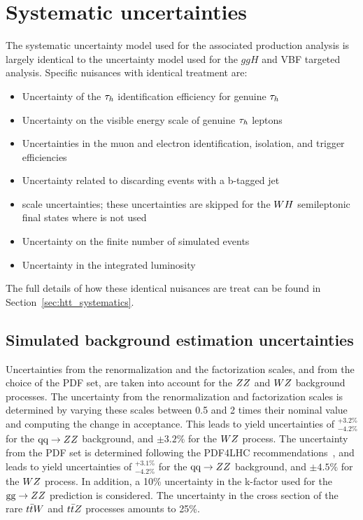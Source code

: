 \section{Systematic uncertainties}
\label{sec:vh_systematics}
The systematic uncertainty model used for the associated production analysis is largely
identical to the uncertainty model used for the $ggH$ and VBF targeted analysis.
Specific nuisances with identical treatment are:
\begin{itemize}
\item Uncertainty of the $\tau_{h}$ identification efficiency for genuine $\tau_{h}$
\item Uncertainty on the visible energy scale of genuine $\tau_{h}$ leptons
\item Uncertainties in the muon and electron identification, isolation, and trigger efficiencies
\item Uncertainty related to discarding events with a b-tagged jet
\item \etvecmiss scale uncertainties; these uncertainties are skipped for the
$WH$ semileptonic final states where \etvecmiss is not used
\item Uncertainty on the finite number of simulated events
\item Uncertainty in the integrated luminosity
\end{itemize}
The full details of how these identical nuisances are treat can be found in
Section~\ref{sec:htt_systematics}.


\subsection{Simulated background estimation uncertainties}
Uncertainties from the renormalization and the factorization scales, and from the 
choice of the PDF set, are taken into account for the $ZZ$ and $WZ$ 
background processes. The uncertainty from the renormalization and factorization 
scales is determined by varying these scales between 0.5 and 2 times their nominal 
value and computing the change in acceptance. This leads to yield uncertainties 
of $^{+3.2\%}_{-4.2\%}$ for the $\text{q}\text{q}\rightarrow ZZ$ background, and $\pm 3.2\%$ 
for the $WZ$ process. The uncertainty from the PDF set is determined following 
the PDF4LHC recommendations~\cite{Butterworth:2015oua}, and leads to yield uncertainties of $^{+3.1\%}_{-4.2\%}$ for 
the $\text{q}\text{q}\rightarrow ZZ$ background, and $\pm 4.5\%$ for the $WZ$ process. 
In addition, a 10\% uncertainty in the k-factor used for the $\text{g}\text{g} \rightarrow 
ZZ$ prediction is considered. The uncertainty in the cross section of the 
rare $t\bar{t}W$ and $t\bar{t}Z$ processes amounts to 25\%.

